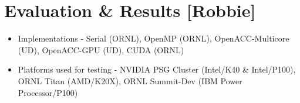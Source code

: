 \section{Evaluation \& Results [Robbie]}
\begin{itemize}
  \item Implementations - Serial (ORNL), OpenMP (ORNL), OpenACC-Multicore (UD), OpenACC-GPU (UD), CUDA (ORNL)
  \item Platforms used for testing - NVIDIA PSG Cluster (Intel/K40 \& Intel/P100), ORNL Titan (AMD/K20X), ORNL Summit-Dev (IBM Power Processor/P100)
\end{itemize}

